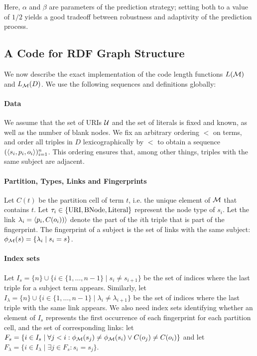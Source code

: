 Here, $\alpha$ and $\beta$ are parameters of the prediction strategy;
setting both to a value of $1/2$ yields a good tradeoff between
robustness and adaptivity of the prediction process.


\subsection{A Code for RDF Graph Structure}
We now describe the exact implementation of the code length functions
$L({\mathcal M})$ and $L_{\mathcal M}(D)$. We use the following sequences and definitions
globally:

\paragraph{Data} We assume that the set of URIs ${\mathcal U}$ and the set of
literals is fixed and known, as well as the number of blank
nodes. We fix an arbitrary ordering $<$ on terms, and order all
triples in $D$ lexicographically by $<$ to obtain a sequence
$({\left\langle{s_i,p_i,o_i}\right\rangle})_{i=1}^n$. This ordering ensures that, among
other things, triples with the same subject are adjacent.

\paragraph{Partition, Types, Links and Fingerprints} 
Let $C(t)$ be the partition cell of term $t$, i.e. the unique element
of ${\mathcal M}$ that contains $t$. Let
$\tau_i\in\{\textnormal{URI},\textnormal{BNode},\textnormal{Literal}\}$ represent the node
type of $s_i$. Let the link $\lambda_i={\left\langle{p_i,C(o_i))}\right\rangle}$ denote the
part of the $i$th triple that is part of the fingerprint. The
fingerprint of a subject is the set of links with the same subject:
$\phi_{\mathcal M}(s)=\{\lambda_i\mid s_i=s\}$.

\paragraph{Index sets}
Let $I_s=\{n\}\cup\{i\in\{1,\ldots,n-1\}\mid s_i\not=s_{i+1}\}$ be the
set of indices where the last triple for a subject term appears.
Similarly, let $I_\lambda=\{n\}\cup\{i\in\{1,\ldots,n-1\}\mid
\lambda_i\not= \lambda_{i+1}\}$ be the set of indices where the last
triple with the same link appears. We also need index sets identifying
whether an element of $I_s$ represents the first occurrence of each
fingerprint for each partition cell, and the set of corresponding
links: let $F_s = \{i \in I_s\mid \forall j<i:
\phi_{\mathcal M}(s_j)\ne\phi_{\mathcal M}(s_i) \vee C(o_j)\ne C(o_i)\}$ and let $F_\lambda =
\{i\in I_\lambda\mid \exists j\in F_s:s_i=s_j\}$.

